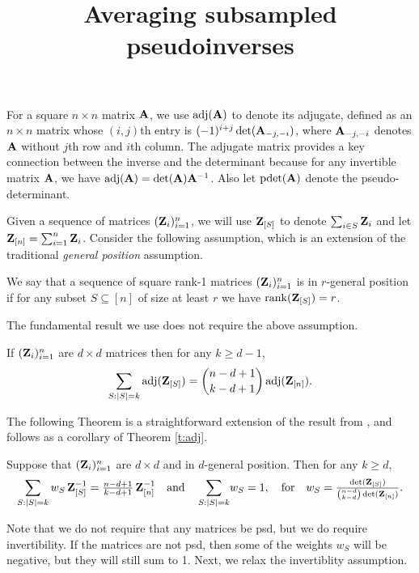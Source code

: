 \documentclass[12pt]{sty/colt2019/colt2018-arxiv}
\title{Averaging subsampled pseudoinverses}
\begin{document}
\maketitle
For a square $n\times n$ matrix $\mathbf A$, we use $\operatorname{\textnormal{adj}}(\mathbf A)$ to denote its adjugate, defined as an $n\times n$ matrix whose $(i,j)$th entry is $(-1)^{i+j}\det(\mathbf A_{-j,-i})$, where $\mathbf A_{-j,-i}$ denotes $\mathbf A$ without $j$th row and $i$th column. 
The adjugate matrix provides a key connection between the inverse and
the determinant because for any invertible matrix $\mathbf A$, we have
$\operatorname{\textnormal{adj}}(\mathbf A) = \det(\mathbf A)\mathbf A^{-1}$. Also let $\mathrm{pdet}(\mathbf A)$ denote the pseudo-determinant.

Given a sequence of matrices $(\mathbf Z_i)_{i=1}^n$, we will use $\mathbf Z_{[S]}$ to
denote $\sum_{i\in S}\mathbf Z_i$ and let $\mathbf Z_{[n]}=\sum_{i=1}^n\mathbf Z_i$. 
Consider the following assumption, which is an
extension of the traditional \emph{general position} assumption.
\begin{assumption}
We say that a sequence of square rank-1 matrices $(\mathbf Z_i)_{i=1}^n$ is in
$r$-general position if for any subset $S\subseteq[n]$ of size at
least $r$ we have $\mathrm{rank}(\mathbf Z_{[S]}) = r$.
\end{assumption}

The fundamental result we use does not require the above assumption.
\begin{theorem}\label{t:adj}
  If $(\mathbf Z_i)_{i=1}^n$ are $d\times d$ matrices then for any $k\geq
  d-1$,
  \begin{align*}
    \sum_{S:|S|=k}\operatorname{\textnormal{adj}}(\mathbf Z_{[S]})=   {n-d+1\choose k-d+1}\operatorname{\textnormal{adj}}(\mathbf Z_{[n]}).
  \end{align*}
\end{theorem}

The following Theorem is a straightforward extension of the result
from \cite{unbiased-estimates-journal}, and follows as a corollary of
Theorem \ref{t:adj}.
   \begin{theorem}\label{t:sqinv}
Suppose that $(\mathbf Z_i)_{i=1}^n$ are $d\times d$ and in $d$-general
position. Then for any $k\geq d$, 
     \begin{align*}
\sum_{S:|S|=k} w_S \,\mathbf Z_{[S]}^{-1} =
       \tfrac{n-d+1}{k-d+1}\,\mathbf Z_{[n]}^{-1}\quad\text{and}\quad 
     \sum_{S:|S|=k}\!w_S = 1,\quad \text{for}\quad w_S=
\tfrac{\det(\mathbf Z_{[S]})}{{n-d\choose k-d}\det(\mathbf Z_{[n]})}.
     \end{align*}
   \end{theorem}
Note that we do not require that any matrices be psd, but we do
require invertibility. If the matrices are not psd, then some of the
weights $w_S$ will be negative, but they will still sum to 1.
Next, we relax the invertiblity assumption.
\end{document}
